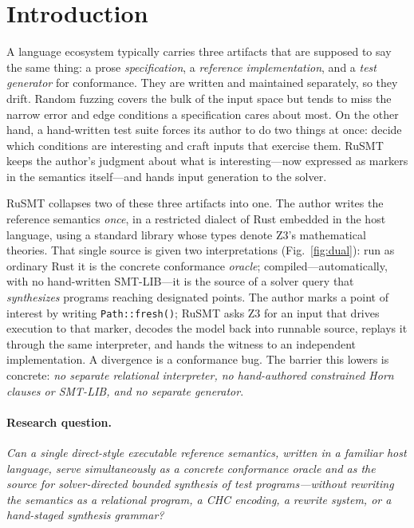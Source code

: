 \documentclass[11pt,a4paper]{article}
\theoremstyle{definition}
\theoremstyle{remark}
\newcommand{\rusmt}{RuSMT}
\newcommand{\code}[1]{\texttt{#1}}
\begin{document}
\section{Introduction}
\label{sec:intro}

A language ecosystem typically carries three artifacts that are supposed to say
the same thing: a prose \emph{specification}, a \emph{reference implementation},
and a \emph{test generator} for conformance. They are written and maintained
separately, so they drift. Random fuzzing covers the bulk of the input space but tends to miss the narrow error and edge conditions a specification cares about most. On the other hand, a hand-written test suite forces its author to do two things at once: decide which conditions are interesting and craft inputs that exercise them. \rusmt{} keeps the author's judgment about what is interesting---now expressed as markers in the semantics itself---and hands input generation to the solver.

\rusmt{} collapses two of these three artifacts into one. The author writes the
reference semantics \emph{once}, in a restricted dialect of Rust embedded in the
host language, using a standard library whose types denote Z3's mathematical
theories. That single source is given two interpretations
(Fig.~\ref{fig:dual}): run as ordinary Rust it is the concrete conformance
\emph{oracle}; compiled---automatically, with no hand-written SMT-LIB---it is the
source of a solver query that \emph{synthesizes} programs reaching designated
points. The author marks a point of interest by writing \code{Path::fresh()};
\rusmt{} asks Z3 for an input that drives execution to that marker, decodes the
model back into runnable source, replays it through the same interpreter, and
hands the witness to an independent implementation. A divergence is a conformance
bug. The barrier this lowers is concrete: \emph{no separate relational
interpreter, no hand-authored constrained Horn clauses or SMT-LIB, and no
separate generator}.

\paragraph{Research question.}
\emph{Can a single direct-style executable reference semantics, written in a
familiar host language, serve simultaneously as a concrete conformance oracle and
as the source for solver-directed bounded synthesis of test programs---without
rewriting the semantics as a relational program, a CHC encoding, a rewrite
system, or a hand-staged synthesis grammar?}
\end{document}

